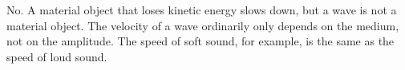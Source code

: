 No. A material object that loses kinetic energy slows down, but a
wave is not a material object. The velocity of a wave ordinarily only
depends on the medium, not on the amplitude. The speed of soft sound,
for example,  is the same as the speed of loud sound.
